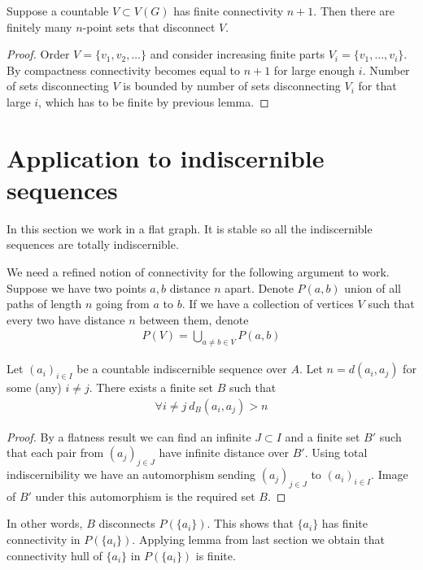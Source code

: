 \documentclass{amsart}
\begin{document}
\begin{Corollary}
	Suppose a countable $V \subset V(G)$ has finite connectivity $n+1$. Then there are finitely many $n$-point sets that disconnect $V$.
\end{Corollary}

\begin{proof}
	Order $V = \{v_1, v_2, \ldots\}$ and consider increasing finite parts $V_i = \{v_1, \dots, v_i\}$. By compactness connectivity becomes equal to $n+1$ for large enough $i$. Number of sets disconnecting $V$ is bounded by number of sets disconnecting $V_i$ for that large $i$, which has to be finite by previous lemma.
\end{proof}

\section{Application to indiscernible sequences}

In this section we work in a flat graph. It is stable so all the indiscernible sequences are totally indiscernible.

We need a refined notion of connectivity for the following argument to work. Suppose we have two points $a,b$ distance $n$ apart. Denote $P(a,b)$ union of all paths of length $n$ going from $a$ to $b$. If we have a collection of vertices $V$ such that every two have distance $n$ between them, denote
\begin{align*}
	P(V) = \bigcup_{a \neq b \in V} P(a,b)
\end{align*}

\begin{Lemma}
	Let $(a_i)_{i \in I}$ be a countable indiscernible sequence over $A$. Let $n = d(a_i, a_j)$ for some (any) $i \neq j$. There exists a finite set $B$ such that
	\begin{align*}
		\forall i \neq j \ d_B(a_i, a_j) > n
	\end{align*}
\end{Lemma}

\begin{proof}
	By a flatness result we can find an infinite $J \subset I$ and a finite set $B'$ such that each pair from $(a_j)_{j \in J}$ have infinite distance over $B'$. Using total indiscernibility we have an automorphism sending $(a_j)_{j \in J}$ to $(a_i)_{i \in I}$. Image of $B'$ under this automorphism is the required set $B$.
\end{proof}

In other words, $B$ disconnects $P(\{a_i\})$. This shows that $\{a_i\}$ has finite connectivity in $P(\{a_i\})$. Applying lemma from last section we obtain that connectivity hull of $\{a_i\}$ in $P(\{a_i\})$ is finite.
\end{document}
